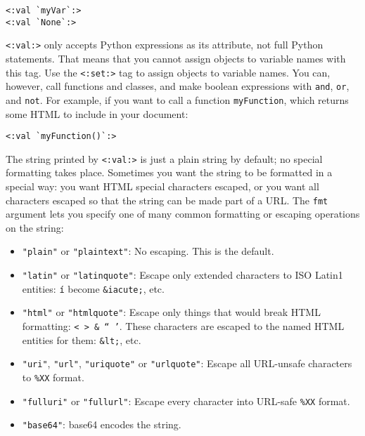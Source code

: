 \documentclass{manual}
\begin{document}
\begin{verbatim}
<:val `myVar`:>
<:val `None`:>
\end{verbatim}

\texttt{<:val:>} only accepts Python expressions as its attribute, 
not full Python statements. That means that you cannot assign 
objects to variable names with this tag. Use the 
\texttt{<:set:>}  tag to assign 
objects to variable names. You can, however, call functions 
and classes, and make boolean expressions with \texttt{and}, 
\texttt{or}, and \texttt{not}. For example, if you want to call
a function \texttt{myFunction}, which returns some HTML to include
in your document:

\begin{verbatim}
<:val `myFunction()`:>
\end{verbatim}

The string printed by \texttt{<:val:>} is just a plain 
string by default; no special formatting takes place. 
Sometimes you want the string to be formatted in a special way: 
you want HTML special characters escaped, or you want all 
characters escaped so that the string can be made part of a URL. 
The \texttt{fmt} argument lets you specify one of many common 
formatting or escaping operations on the string:

\begin{itemize}
\item \texttt{"plain"} or \texttt{"plaintext"}: 
No escaping. This is the default.

\item 
\texttt{"latin"} or \texttt{"latinquote"}: 
Escape only extended characters to ISO Latin1 
entities: \texttt{\'i} become \texttt{\&iacute;}, etc.


\item 
\texttt{"html"} or \texttt{"htmlquote"}: 
Escape only things that would break HTML 
formatting: \texttt{< > \& `` '}.
These characters are escaped to the named HTML entities
for them: \texttt{\&lt;}, etc.


\item 
\texttt{"uri"}, \texttt{"url"}, \texttt{"uriquote"} 
or \texttt{"urlquote"}: 
Escape all URL-unsafe characters to \texttt{\%XX} format.


\item \texttt{"fulluri"} or \texttt{"fullurl"}: 
Escape every character into URL-safe \texttt{\%XX} format.


\item \texttt{"base64"}: base64 encodes the string.

\end{itemize}
\end{document}
